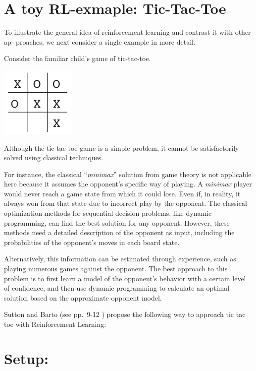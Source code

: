 \documentclass[
  letterpaper,
]{krantz}
\theoremstyle{plain}
\theoremstyle{definition}
\theoremstyle{definition}
\theoremstyle{remark}
\begin{document}
\section{A toy RL-exmaple:
Tic-Tac-Toe}\label{a-toy-rl-exmaple-tic-tac-toe}

To illustrate the general idea of reinforcement learning and contrast it
with other ap- proaches, we next consider a single example in more
detail.

Consider the familiar child's game of tic-tac-toe.

\includegraphics{02-introductionToRL/../assets/tic_tac_toe.jpeg}

Although the tic-tac-toe game is a simple problem, it cannot be
satisfactorily solved using classical techniques.

For instance, the classical ``\emph{minimax}'' solution from game theory
is not applicable here because it assumes the opponent's specific way of
playing. A \emph{minimax} player would never reach a game state from
which it could lose. Even if, in reality, it always won from that state
due to incorrect play by the opponent. The classical optimization
methods for sequential decision problems, like dynamic programming, can
find the best solution for any opponent. However, these methods need a
detailed description of the opponent as input, including the
probabilities of the opponent's moves in each board state.

Alternatively, this information can be estimated through experience,
such as playing numerous games against the opponent. The best approach
to this problem is to first learn a model of the opponent's behavior
with a certain level of confidence, and then use dynamic programming to
calculate an optimal solution based on the approximate opponent model.

Sutton and Barto (see pp.~9-12 ) propose the following way to approach tic tac toe with
Reinforcement Learning:

\section*{Setup:}\label{setup}
\end{document}
